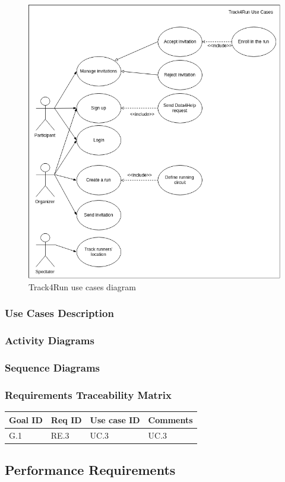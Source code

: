 \documentclass[12pt]{article}
\begin{document}
\begin{itemize}
\begin{figure}[H]
\centering
	\includegraphics[scale=0.6]{Diagrams/t4r_use_cases.png}
\caption[Track4Run use cases]{Track4Run use cases diagram}
\label{fig:t4r_use_cases}
\end{figure}

\end{itemize}

\subsubsection{Use Cases Description}

\subsubsection{Activity Diagrams}

\subsubsection{Sequence Diagrams}

\subsubsection{Requirements Traceability Matrix}
\begin{tabular}{ | l | l | l | l |}
    \hline
    \textbf{Goal ID} & \textbf{Req ID} & \textbf{Use case ID} & \textbf{Comments} \\ \hline
    G.1 & RE.3 & UC.3 & UC.3 \\ \hline
\end{tabular}

\subsection{Performance Requirements}
\end{document}
